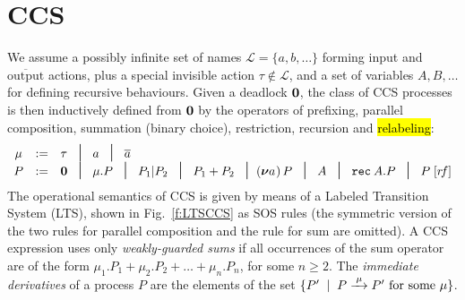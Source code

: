 
\section{CCS}
\label{ss:ccs}

We assume  a possibly infinite set of names $\mathscr{L} = \{a, b,
\ldots\}$ forming input and $\overline{\mbox{output}}$ actions, plus a special invisible
action $\tau \notin \mathscr{L}$, and a set of variables $A,B,
\ldots$ for defining recursive behaviours.
Given a deadlock ${\boldsymbol 0}$, the class of CCS processes is then inductively defined from ${\boldsymbol 0}$ by the operators
of prefixing, parallel composition, summation (binary choice), restriction, recursion and \hl{relabeling}:
\begin{equation*}
\begin{array}{ccl}
\mu  & := &  \tau \hspace{.3pt} \; \midd \; a  \; \midd \;  \outC a  \\
P  & := &  \nil \; \midd \;  \mu . P \; \midd \;  P_1 |  P_2 \; \midd  \;
P_1 + P_2 \; \midd %
  (\res a\!)\, P  \;  \midd \;  A \; \midd \; \recu A  P
\; \midd \; P\; [r\!f]  %
\end{array}
\end{equation*}
The operational semantics of CCS is given by means of
a Labeled Transition System (LTS), shown in Fig.~\ref{f:LTSCCS} as SOS
rules (the symmetric version of the two rules for
parallel composition and the rule for sum are omitted).
A CCS expression uses only \emph{weakly-guarded sums} if all occurrences of
the sum operator are of the form $\mu_1.P_1 + \mu_2.P_2 + \ldots
+ \mu_n.P_n$, for some $n \geq 2$.
 The \emph{immediate derivatives} of a
process $P$ are the elements of the set $\{P' \st P \arr\mu P' \mbox{
  for some $\mu$}\}$.
